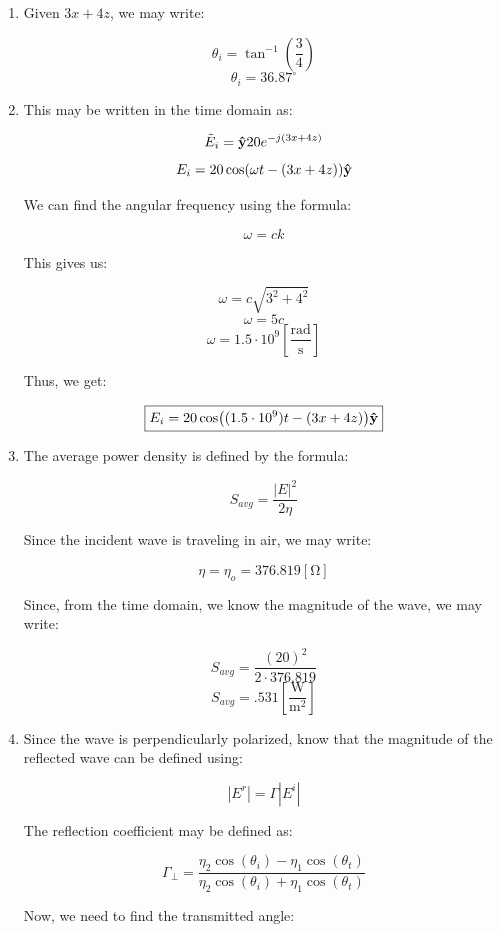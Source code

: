 \begin{enumerate}
\begin{enumerate}
      \item 

        Given $3x+4z$, we may write:

        $$\theta_i=\tan^{-1}\left( \frac{3}{4} \right)$$
        $$\boxed{\theta_i=36.87^{\circ}}$$

      \item 

        This may be written in the time domain as:

        $$\tilde{E}_i=\bold{\hat{y}}20e^{-j(3x+4z)}$$
        $$E_i=20\cos(\omega t-(3x+4z))\bold{\hat{y}}$$

        We can find the angular frequency using the formula:

        $$\omega=ck$$

        This gives us:

        $$\omega=c\sqrt{3^2+4^2}$$
        $$\omega=5c$$
        $$\omega=1.5\cdot10^{9}\left[ \frac{\text{rad}}{\si{\second}} \right]$$

        Thus, we get:

        $$\boxed{E_i=20\cos((1.5\cdot10^9) t-(3x+4z))\bold{\hat{y}}}$$

      \item 

        The average power density is defined by the formula:

        $$S_{avg}=\frac{|E|^2}{2\eta}$$

        Since the incident wave is traveling in air, we may write:

        $$\eta=\eta_o=376.819[\si{\ohm}]$$

        Since, from the time domain, we know the magnitude of the wave, we may write:

        $$S_{avg}=\frac{(20)^2}{2\cdot376.819}$$
        $$\boxed{S_{avg}=.531\left[ \frac{\si{\watt}}{\si{\meter\squared}} \right]}$$

      \item 

        Since the wave is perpendicularly polarized, know that the magnitude of the reflected wave can be defined using:

        $$|E^r|=\Gamma|E^i|$$

        The reflection coefficient may be defined as:

        $$\Gamma_{\perp}=\frac{\eta_2\cos(\theta_i)-\eta_1\cos(\theta_t)}{\eta_2\cos(\theta_i)+\eta_1\cos(\theta_t)}$$

        Now, we need to find the transmitted angle:


\end{enumerate}
\end{enumerate}

